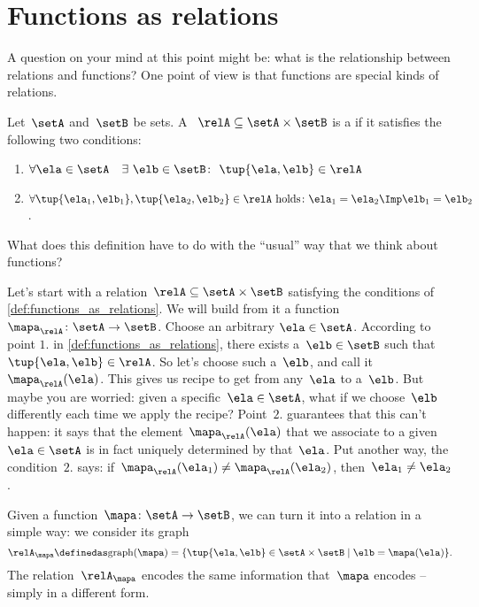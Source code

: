 

\section{Functions as relations}

A question on your mind at this point might be: what is the relationship between relations and functions? One point of view is that functions are special kinds of relations.

\begin{definition}
    \label{def:functions_as_relations}
    Let~$\setA$ and~$\setB$ be sets. A ~$\relA \subseteq \setA \times \setB$ is a \emph{} if it satisfies the following two conditions:
    \begin{enumerate}
        \item $\forall \ela \in \setA \quad \exists \ \elb \in \setB\colon  \ \tup{\ela,\elb} \in \relA$
        \item $\forall \tup{\ela_1, \elb_1}, \tup{\ela_2, \elb_2} \in \relA  \text{ holds}\colon \ela_1 = \ela_2 \Imp \elb_1 = \elb_2$.
    \end{enumerate}
\end{definition}

What does this definition have to do with the ``usual'' way that we think about functions?

Let's start with a relation~$\relA \subseteq \setA \times \setB$ satisfying the conditions of \cref{def:functions_as_relations}. We will build from it a function~$\mapa_\relA \colon \setA \to \setB$. Choose an arbitrary $\ela \in \setA$. According to point $1.$ in \cref{def:functions_as_relations}, there exists a~$\elb \in \setB$ such that~$\tup{\ela,\elb} \in \relA$. So let's choose such a~$\elb$, and call it~$\mapa_\relA(\ela)$. This gives us recipe to get from any~$\ela$ to a~$\elb$. But maybe you are worried: given a specific~$\ela \in \setA$, what if we choose~$\elb$ differently each time we apply the recipe? Point~$2.$ guarantees that this can't happen: it says that the element~$\mapa_\relA(\ela)$ that we associate to a given~$\ela \in \setA$ is in fact uniquely determined by that~$\ela$. Put another way, the condition~$2.$ says: if~$\mapa_\relA(\ela_1) \neq \mapa_\relA(\ela_2)$, then~$\ela_1 \neq\ela_2$.

Given a function~$\mapa \colon \setA \to \setB$, we can turn it into a relation in a simple way: we consider its graph
\begin{equation*}
    \relA_\mapa \definedas \text{graph}(\mapa) = \{ \tup{\ela,\elb} \in \setA \times \setB \mid \elb= \mapa(\ela) \}.
\end{equation*}
The relation~$\relA_\mapa$ encodes the same information that~$\mapa$ encodes -- simply in a different form.

